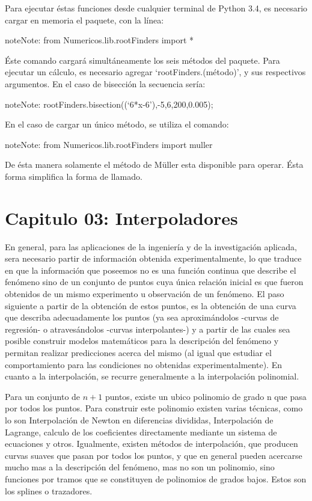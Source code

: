 \documentclass[letterpaper,10pt,oneside]{sphinxmanual}
\theoremstyle{plain}%
\theoremstyle{definition}%
\theoremstyle{remark}%
\begin{document}
Para ejecutar éstas funciones desde cualquier terminal de Python 3.4, es necesario cargar en memoria el paquete, con la línea:

\begin{notice}{note}{Note:}
from Numericos.lib.rootFinders import *
\end{notice}

Éste comando cargará simultáneamente los seis métodos del paquete. Para ejecutar un cálculo, es necesario agregar `rootFinders.(método)',
y sus respectivos argumentos. En el caso de bisección la secuencia sería:

\begin{notice}{note}{Note:}
rootFinders.bisection((`6*x-6'),-5,6,200,0.005);
\end{notice}

En el caso de cargar un único método, se utiliza el comando:

\begin{notice}{note}{Note:}
from Numericos.lib.rootFinders import muller
\end{notice}

De ésta manera solamente el método de Müller esta disponible para operar. Ésta forma simplifica la forma de llamado.


\chapter{Capitulo 03: Interpoladores}
\label{chapter03::doc}\label{chapter03:capitulo-03-Interpoladores}

\noindent En general, para las aplicaciones de la ingeniería y de la investigación aplicada, sera necesario partir de información obtenida experimentalmente, lo que traduce en que la información que poseemos no es una función continua que describe el fenómeno sino de un conjunto de puntos cuya única relación inicial es que fueron obtenidos de un mismo experimento u observación de un fenómeno. El paso siguiente a partir de la obtención de estos puntos, es la obtención de una curva que describa adecuadamente los puntos (ya sea aproximándolos -curvas de regresión- o atravesándolos -curvas interpolantes-) y a partir de las cuales sea posible
construir modelos matemáticos para la descripción del fenómeno y permitan realizar predicciones acerca del mismo (al igual que estudiar el comportamiento para las condiciones no obtenidas experimentalmente). En cuanto a la interpolación, se recurre generalmente a la interpolación polinomial.\medskip

\noindent Para un conjunto de $n + 1$ puntos, existe un ubico polinomio de grado n que pasa por todos los puntos. Para construir este polinomio existen varias técnicas, como lo son Interpolación de Newton en diferencias divididas, Interpolación de Lagrange, calculo de los coeficientes directamente mediante un sistema de ecuaciones y otros. Igualmente, existen métodos de interpolación, que producen curvas suaves que pasan por todos los puntos, y que en general pueden acercarse mucho mas a la descripción del fenómeno, mas no son un polinomio, sino funciones por tramos que se constituyen de polinomios de grados bajos. Estos son los splines o trazadores.\medskip
\end{document}
